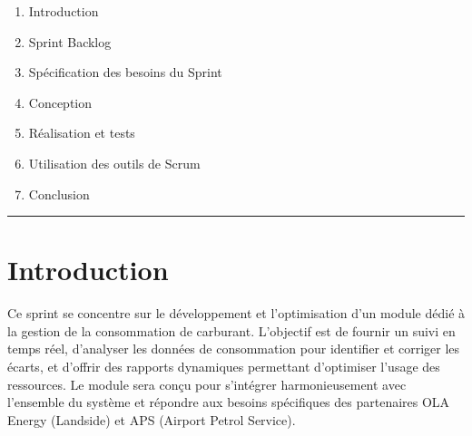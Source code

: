 \documentclass[a4paper,11pt]{report}
\begin{document}
\begin{enumerate}[%
  label=\bfseries\Large\arabic*., 
  leftmargin=2cm, 
  itemsep=1em
]
   \item Introduction
  \item Sprint Backlog
  \item Spécification des besoins du Sprint
  \item Conception
  \item Réalisation et tests
  \item Utilisation des outils de Scrum
  \item Conclusion
\end{enumerate}

\vfill
\begin{center}
  \color{blue!60!black}\rule{0.6\textwidth}{0.8pt}
\end{center}

\newpage
\setcounter{section}{0}

\section{Introduction}

Ce sprint se concentre sur le développement et l’optimisation d’un module dédié à la gestion de la consommation de carburant. L’objectif est de fournir un suivi en temps réel, d’analyser les données de consommation pour identifier et corriger les écarts, et d’offrir des rapports dynamiques permettant d’optimiser l’usage des ressources. Le module sera conçu pour s’intégrer harmonieusement avec l’ensemble du système et répondre aux besoins spécifiques des partenaires OLA Energy (Landside) et APS (Airport Petrol Service).
\end{document}
